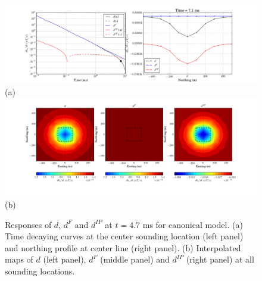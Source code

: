 \documentclass[a4paper, 11pt]{article}
\begin{document}
\begin{figure}[htb]
  \centering
  \includegraphics[height=0.2\textheight]{figures/synthetic/EMIPCase1_ch38_profile.png} \\ (a)
  \\
  \includegraphics[height=0.25\textheight]{figures/synthetic/EMIPCase1_ch38_plan.png} \\ (b)
  \caption{Responses of $d$, $d^{F}$ and $d^{IP}$ at $t=4.7$ ms for canonical model. (a) Time decaying curves at the center sounding location (left panel) and northing profile at center line (right panel). (b) Interpolated maps of $d$ (left panel), $d^{F}$ (middle panel) and $d^{IP}$ (right panel) at all sounding locations.}
  \label{F: EMIPresp2_case1}
\end{figure}
\end{document}
